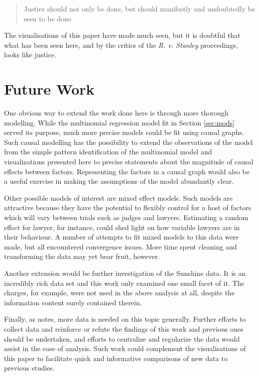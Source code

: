 \begin{quote}
  Justice should not only be done, but should manifestly and undoubtedly be seen to be done
\end{quote}

The visualisations of this paper have made much seen, but it is doubtful that what has been seen here, and by the critics of the
\textit{R. v. Stanley} proceedings, looks like justice.

\section{Future Work}
\label{sec:FutureWork}

One obvious way to extend the work done here is through more thorough modelling. While the multinomial regression model fit in
Section \ref{sec:mods} served its purpose, much more precise models could be fit using causal graphs. Such causal modelling has the
possibility to extend the observations of the model from the simple pattern identification of the multinomial model and
visualizations presented here to precise statements about the magnitude of causal effects between factors. Representing the
factors in a causal graph would also be a useful exercise in making the assumptions of the model abundantly clear.

Other possible models of interest are mixed effect models. Such models are attractive because they have the potential to flexibly control for a host of factors which will vary between trials such as judges and lawyers. Estimating a random effect for lawyer,
for instance, could shed light on how variable lawyers are in their behaviour. A number of attempts to fit mixed models to this data were made, but all encountered convergence issues. More time spent cleaning and transforming the data may yet bear fruit, however.

Another extension would be further investigation of the Sunshine data. It is an incredibly rich data set and this work only
examined one small facet of it. The charges, for example, were not used in the above analysis at all, despite the information content surely contained therein.

Finally, as \cite{JurySunshineProj} notes, more data is needed on this topic generally. Further efforts to collect data and
reinforce or refute the findings of this work and previous ones should be undertaken, and efforts to centralize and regularize the
data would assist in the ease of analysis. Such work could complement the visualisations of
this paper to facilitate quick and informative comparisons of new data to previous studies.


